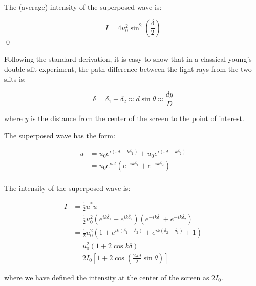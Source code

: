 \documentclass[12pt]{article}
\begin{document}
The (average) intensity of the superposed wave is:

\begin{equation}
    I = 4u_{0}^{2} \sin^{2}{\left( \frac{\delta}{2} \right)}
\end{equation}
\qed



Following the standard derivation, it is easy to show that in a classical young's double-slit experiment, the path difference between the light rays from the two slits is:

\begin{equation}
    \delta = \delta_{1} - \delta_{2} \approx d\sin{\theta} \approx \frac{dy}{D}
\end{equation}

where $y$ is the distance from the center of the screen to the point of interest.

The superposed wave has the form:

\begin{equation}
    \begin{split}
        u &= u_{0} e^{i(\omega t - k \delta_{1})} + u_{0} e^{i(\omega t - k \delta_{2})} \\
        &= u_{0} e^{i\omega t} \left( e^{-ik\delta_{1}} + e^{-ik\delta_{2}} \right) \\
    \end{split}
\end{equation}

The intensity of the superposed wave is:

\begin{equation}
    \begin{split}
        I &= \frac{1}{2} u^{*}u \\
        &= \frac{1}{2} u_{0}^{2} \left( e^{ik\delta_{1}} + e^{ik\delta_{2}} \right) \left( e^{-ik\delta_{1}} + e^{-ik\delta_{2}} \right) \\
        &= \frac{1}{2} u_{0}^{2} \left( 1 + e^{ik(\delta_{1} - \delta_{2})} + e^{ik(\delta_{2} - \delta_{1})} + 1 \right) \\
        &= u_{0}^{2} \left( 1 + 2\cos{k\delta} \right) \\
        &= 2I_{0} \left[ 1 + 2\cos{\left( \frac{2\pi d}{\lambda} \sin{\theta} \right)} \right]
    \end{split}
\end{equation}

where we have defined the intensity at the center of the screen as $2I_{0}$.
\end{document}
